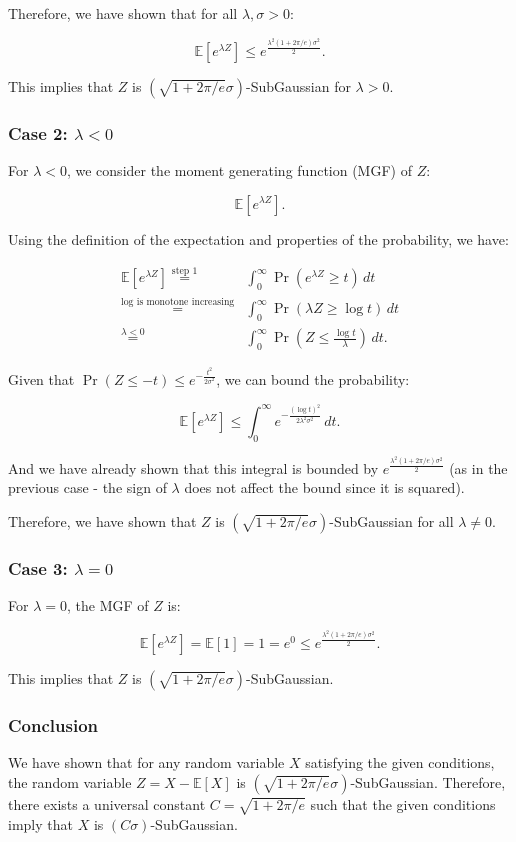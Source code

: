 \documentclass[a4 paper]{article}
\theoremstyle{boldStyle}
\theoremstyle{boldBlueStyle}
\theoremstyle{boldPurpleStyle}
\theoremstyle{boldRedStyle}
\begin{document}
Therefore, we have shown that for all $\lambda, \sigma > 0$:

\[
\mathbb{E}[e^{\lambda Z}] \leq  e^{\frac{\lambda^2 (1 + 2\pi/e) \sigma^2}{2}}.
\]

This implies that \(Z\) is \((\sqrt{1 + 2\pi/e} \sigma)\)-SubGaussian for \(\lambda > 0\).

\subsubsection*{Case 2: \(\lambda < 0\)}

For \(\lambda < 0\), we consider the moment generating function (MGF) of \(Z\):

\[
\mathbb{E}[e^{\lambda Z}].
\]

Using the definition of the expectation and properties of the probability, we have:

\begin{align*}
\mathbb{E}[e^{\lambda Z}] \stackrel{\text{step 1}}{=} &\int_0^\infty \Pr(e^{\lambda Z} \geq t) \, dt \\
\stackrel{\text{log is monotone increasing}}{=} &\int_0^\infty \Pr(\lambda Z \geq \log t) \, dt \\
\stackrel{\lambda < 0}{=} &\int_0^\infty \Pr\left(Z \leq \frac{\log t}{\lambda}\right) \, dt.
\end{align*}

Given that \(\Pr(Z \leq -t) \leq e^{-\frac{t^2}{2\sigma^2}}\), we can bound the probability:

\[
\mathbb{E}[e^{\lambda Z}] \leq \int_0^\infty e^{-\frac{(\log t)^2}{2\lambda^2 \sigma^2}} \, dt.
\]

And we have already shown that this integral is bounded by \(e^{\frac{\lambda^2 (1 + 2\pi/e) \sigma^2}{2}}\) 
(as in the previous case - the sign of \(\lambda\) does not affect the bound since it is squared).

Therefore, we have shown that \(Z\) is \((\sqrt{1 + 2\pi/e} \sigma)\)-SubGaussian for all \(\lambda \neq 0\).


\subsubsection*{Case 3: \(\lambda = 0\)}

For \(\lambda = 0\), the MGF of \(Z\) is:

\[
\mathbb{E}[e^{\lambda Z}] = \mathbb{E}[1] = 1 = e^0 \leq e^{\frac{\lambda^2 (1 + 2\pi/e) \sigma^2}{2}}.
\]

This implies that \(Z\) is \((\sqrt{1 + 2\pi/e} \sigma)\)-SubGaussian.


\subsubsection*{Conclusion}

We have shown that for any random variable \(X\) satisfying the given conditions, the random variable \(Z = X - \mathbb{E}[X]\) is \((\sqrt{1 + 2\pi/e} \sigma)\)-SubGaussian. 
Therefore, there exists a universal constant \(C = \sqrt{1 + 2\pi/e}\) such that the given conditions imply that \(X\) is \((C\sigma)\)-SubGaussian.
\end{document}

